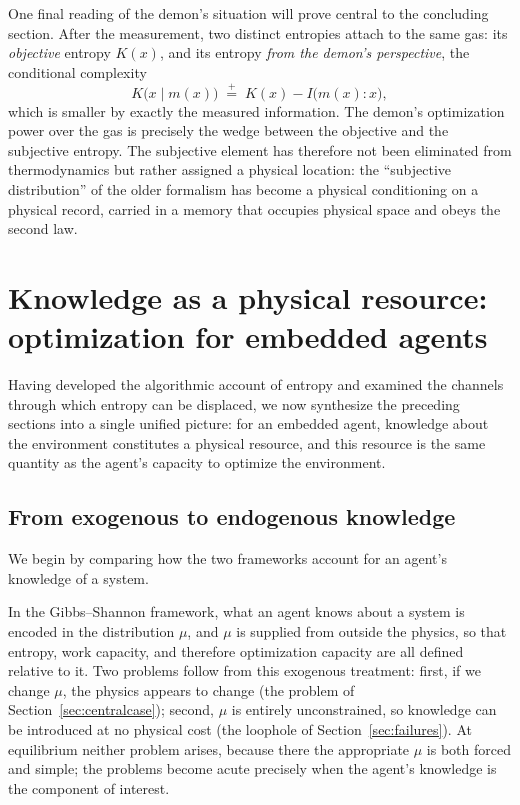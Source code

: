 \documentclass[11pt]{article}
\newcommand{\peq}{\mathrel{\stackrel{+}{=}}}
\begin{document}
One final reading of the demon's situation will prove central to the concluding section. After the measurement, two distinct entropies attach to the same gas: its \emph{objective} entropy $K(x)$, and its entropy \emph{from the demon's perspective}, the conditional complexity
\[
K\big(x \mid m(x)\big) \;\peq\; K(x) - I\big(m(x) : x\big),
\]
which is smaller by exactly the measured information. The demon's optimization power over the gas is precisely the wedge between the objective and the subjective entropy. The subjective element has therefore not been eliminated from thermodynamics but rather assigned a physical location: the ``subjective distribution'' of the older formalism has become a physical conditioning on a physical record, carried in a memory that occupies physical space and obeys the second law.
\section{Knowledge as a physical resource: optimization for embedded agents}
\label{sec:embedded}

Having developed the algorithmic account of entropy and examined the channels through which entropy can be displaced, we now synthesize the preceding sections into a single unified picture: for an embedded agent, knowledge about the environment constitutes a physical resource, and this resource is the same quantity as the agent's capacity to optimize the environment.

\subsection{From exogenous to endogenous knowledge}
\label{sec:endogenous}

We begin by comparing how the two frameworks account for an agent's knowledge of a system.

In the Gibbs--Shannon framework, what an agent knows about a system is encoded in the distribution $\mu$, and $\mu$ is supplied from outside the physics, so that entropy, work capacity, and therefore optimization capacity are all defined relative to it. Two problems follow from this exogenous treatment: first, if we change $\mu$, the physics appears to change (the problem of Section~\ref{sec:centralcase}); second, $\mu$ is entirely unconstrained, so knowledge can be introduced at no physical cost (the loophole of Section~\ref{sec:failures}). At equilibrium neither problem arises, because there the appropriate $\mu$ is both forced and simple; the problems become acute precisely when the agent's knowledge is the component of interest.
\end{document}
